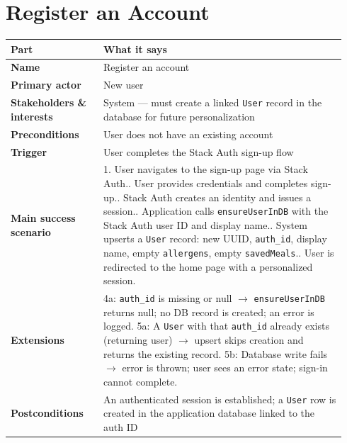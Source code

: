 \documentclass[11pt,twocolumn]{article}
\newcommand{\ucheader}{%
\textbf{Part} & \textbf{What it says} \\
\hline
\endhead
\hline
\endfoot
}
\begin{document}
\section{Register an Account}
{\footnotesize
\begin{longtable}{@{}p{0.26\linewidth}p{0.68\linewidth}@{}}
\hline
\ucheader
\textbf{Name} & Register an account \\
\hline
\textbf{Primary actor} & New user \\
\hline
\textbf{Stakeholders \& interests} & System --- must create a linked \texttt{User} record in the database for future personalization \\
\hline
\textbf{Preconditions} & User does not have an existing account \\
\hline
\textbf{Trigger} & User completes the Stack Auth sign-up flow \\
\hline
\textbf{Main success scenario} & 1. User navigates to the sign-up page via Stack Auth.\newline
2. User provides credentials and completes sign-up.\newline
3. Stack Auth creates an identity and issues a session.\newline
4. Application calls \texttt{ensureUserInDB} with the Stack Auth user ID and display name.\newline
5. System upserts a \texttt{User} record: new UUID, \texttt{auth\_id}, display name, empty \texttt{allergens}, empty \texttt{savedMeals}.\newline
6. User is redirected to the home page with a personalized session. \\
\hline
\textbf{Extensions} & 4a: \texttt{auth\_id} is missing or null $\rightarrow$ \texttt{ensureUserInDB} returns null; no DB record is created; an error is logged.\newline
5a: A \texttt{User} with that \texttt{auth\_id} already exists (returning user) $\rightarrow$ upsert skips creation and returns the existing record.\newline
5b: Database write fails $\rightarrow$ error is thrown; user sees an error state; sign-in cannot complete. \\
\hline
\textbf{Postconditions} & An authenticated session is established; a \texttt{User} row is created in the application database linked to the auth ID \\
\hline
\end{longtable}
}
\end{document}
